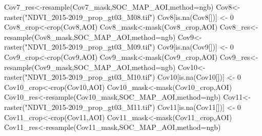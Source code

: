 \documentclass[
  10pt,
  b5paper,
]{book}
\newenvironment{Shaded}{\begin{snugshade}}{\end{snugshade}}
\newcommand{\AttributeTok}[1]{\textcolor[rgb]{0.77,0.63,0.00}{#1}}
\newcommand{\DecValTok}[1]{\textcolor[rgb]{0.00,0.00,0.81}{#1}}
\newcommand{\FunctionTok}[1]{\textcolor[rgb]{0.00,0.00,0.00}{#1}}
\newcommand{\NormalTok}[1]{#1}
\newcommand{\OtherTok}[1]{\textcolor[rgb]{0.56,0.35,0.01}{#1}}
\newcommand{\StringTok}[1]{\textcolor[rgb]{0.31,0.60,0.02}{#1}}
\begin{document}
\begin{Shaded}
\begin{Highlighting}[]
\NormalTok{Cov7\_res}\OtherTok{\textless{}{-}}\FunctionTok{resample}\NormalTok{(Cov7\_mask,SOC\_MAP\_AOI,}\AttributeTok{method=}\StringTok{\textquotesingle{}ngb\textquotesingle{}}\NormalTok{) }
\NormalTok{Cov8}\OtherTok{\textless{}{-}}\FunctionTok{raster}\NormalTok{(}\StringTok{"NDVI\_2015{-}2019\_prop\_gt03\_M08.tif"}\NormalTok{)}
\NormalTok{Cov8[}\FunctionTok{is.na}\NormalTok{(Cov8[])] }\OtherTok{\textless{}{-}} \DecValTok{0}
\NormalTok{Cov8\_crop}\OtherTok{\textless{}{-}}\FunctionTok{crop}\NormalTok{(Cov8,AOI)}
\NormalTok{Cov8\_mask}\OtherTok{\textless{}{-}}\FunctionTok{mask}\NormalTok{(Cov8\_crop,AOI)}
\NormalTok{Cov8\_res}\OtherTok{\textless{}{-}}\FunctionTok{resample}\NormalTok{(Cov8\_mask,SOC\_MAP\_AOI,}\AttributeTok{method=}\StringTok{\textquotesingle{}ngb\textquotesingle{}}\NormalTok{) }
\NormalTok{Cov9}\OtherTok{\textless{}{-}}\FunctionTok{raster}\NormalTok{(}\StringTok{"NDVI\_2015{-}2019\_prop\_gt03\_M09.tif"}\NormalTok{)}
\NormalTok{Cov9[}\FunctionTok{is.na}\NormalTok{(Cov9[])] }\OtherTok{\textless{}{-}} \DecValTok{0}
\NormalTok{Cov9\_crop}\OtherTok{\textless{}{-}}\FunctionTok{crop}\NormalTok{(Cov9,AOI)}
\NormalTok{Cov9\_mask}\OtherTok{\textless{}{-}}\FunctionTok{mask}\NormalTok{(Cov9\_crop,AOI)}
\NormalTok{Cov9\_res}\OtherTok{\textless{}{-}}\FunctionTok{resample}\NormalTok{(Cov9\_mask,SOC\_MAP\_AOI,}\AttributeTok{method=}\StringTok{\textquotesingle{}ngb\textquotesingle{}}\NormalTok{) }
\NormalTok{Cov10}\OtherTok{\textless{}{-}}\FunctionTok{raster}\NormalTok{(}\StringTok{"NDVI\_2015{-}2019\_prop\_gt03\_M10.tif"}\NormalTok{)}
\NormalTok{Cov10[}\FunctionTok{is.na}\NormalTok{(Cov10[])] }\OtherTok{\textless{}{-}} \DecValTok{0}
\NormalTok{Cov10\_crop}\OtherTok{\textless{}{-}}\FunctionTok{crop}\NormalTok{(Cov10,AOI)}
\NormalTok{Cov10\_mask}\OtherTok{\textless{}{-}}\FunctionTok{mask}\NormalTok{(Cov10\_crop,AOI)}
\NormalTok{Cov10\_res}\OtherTok{\textless{}{-}}\FunctionTok{resample}\NormalTok{(Cov10\_mask,SOC\_MAP\_AOI,}\AttributeTok{method=}\StringTok{\textquotesingle{}ngb\textquotesingle{}}\NormalTok{) }
\NormalTok{Cov11}\OtherTok{\textless{}{-}}\FunctionTok{raster}\NormalTok{(}\StringTok{"NDVI\_2015{-}2019\_prop\_gt03\_M11.tif"}\NormalTok{)}
\NormalTok{Cov11[}\FunctionTok{is.na}\NormalTok{(Cov11[])] }\OtherTok{\textless{}{-}} \DecValTok{0}
\NormalTok{Cov11\_crop}\OtherTok{\textless{}{-}}\FunctionTok{crop}\NormalTok{(Cov11,AOI)}
\NormalTok{Cov11\_mask}\OtherTok{\textless{}{-}}\FunctionTok{mask}\NormalTok{(Cov11\_crop,AOI)}
\NormalTok{Cov11\_res}\OtherTok{\textless{}{-}}\FunctionTok{resample}\NormalTok{(Cov11\_mask,SOC\_MAP\_AOI,}\AttributeTok{method=}\StringTok{\textquotesingle{}ngb\textquotesingle{}}\NormalTok{) }

\end{Highlighting}
\end{Shaded}
\end{document}
